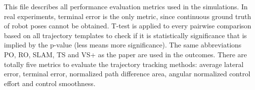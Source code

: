 \documentclass[11pt]{article}
\begin{document}
This file describes all performance evaluation metrics used in the simulations. 
In real experiments, terminal error is the only metric, since continuous 
ground truth of robot poses cannot be obtained. 
T-test is applied to every pairwise comparison based on all trajectory 
templates to check if it is statistically 
significance that is implied by the p-value (less means more significance).
The same abbreviations PO, RO, SLAM, TS and VS+ as the paper 
are used in the outcomes.
There are totally five metrics to evaluate the trajectory tracking methods:
average lateral error, terminal error, normalized path difference area, 
angular normalized control effort and control smoothness.




%







    
\end{document}

